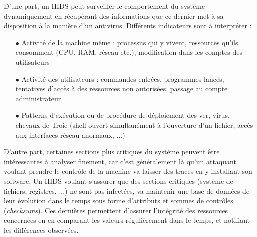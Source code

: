 \documentclass[]{article}
\begin{document}
\par D'une part, un HIDS peut surveiller le comportement du système  dynamiquement en récupérant des informations que ce dernier met à sa disposition à la manière d'un antivirus. Différents indicateurs sont à interpréter :
\vspace{0.2cm}
\begin{itemize}
\item[$\bullet$] Activité de la machine même : processus qui y vivent, ressources qu'ils consomment (CPU, RAM, réseau etc.), modification dans les comptes des utilisateurs
\vspace{0.2cm}
\item[$\bullet$] Activité des utilisateurs : commandes entrées, programmes lancés, tentatives d'accès à des ressources non autorisées, passage au compte administrateur
\vspace{0.2cm}
\item[$\bullet$] Patterns d'exécution ou de procédure de déploiement des ver, virus, chevaux de Troie (shell ouvert simultanément à l'ouverture d'un fichier, accès aux interfaces réseau anormaux, ...)
\end{itemize}
\vspace{0.4cm}
\par D'autre part, certaines sections plus critiques du système peuvent être intéressantes à analyser finement, car c'est généralement là qu'un attaquant voulant prendre le contrôle de la machine va laisser des traces en y installant son software. Un HIDS voulant s'assurer que des sections critiques (système de fichiers, registres, ...) ne sont pas infectées, va maintenir une base de données de leur évolution dans le temps sous forme d'attributs et sommes de contrôles (\textit{checksums}). Ces dernières permettent d'assurer l'intégrité des ressources concernées en en comparant les valeurs régulièrement dans le temps, et notifiant les différences observées.
\end{document}
